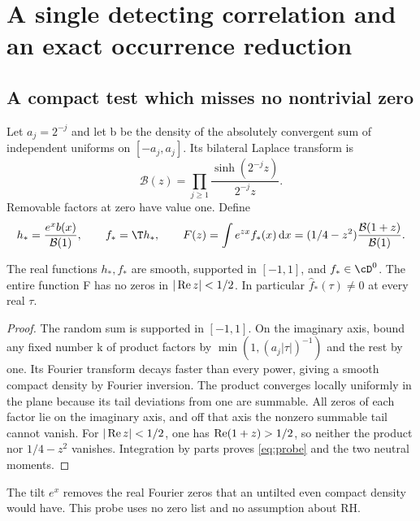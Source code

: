 \section{A single detecting correlation and an exact occurrence reduction}\label{sec:probe}
\subsection{A compact test which misses no nontrivial zero}
Let $a_j=2^{-j}$ and let b be the density of the absolutely
convergent sum of independent uniforms on $[-a_j,a_j]$.
Its bilateral Laplace transform is
\begin{equation}\label{eq:probe-product}
\mathcal B(z)=\prod_{j\ge1}\frac{\sinh(2^{-j}z)}{2^{-j}z}.
\end{equation}
Removable factors at zero have value one. Define
\begin{equation}\label{eq:probe}
h_*=\frac{e^x b(x)}{\mathcal B(1)},\qquad f_*=\T h_*,
\qquad
F(z)=\int e^{zx}f_*(x)\dd x
=(1/4-z^2)\frac{\mathcal B(1+z)}{\mathcal B(1)} .
\end{equation}

\begin{lemma}\label{lem:probe}
The real functions $h_*,f_*$ are smooth, supported in
$[-1,1]$, and $f_*\in\cD^0$. The entire function F has
no zeros in $|\operatorname{Re} z|<1/2$. In particular
$\widehat f_*(\tau)\ne0$ at every real $\tau$.
\end{lemma}
\begin{proof}
The random sum is supported in $[-1,1]$. On the imaginary
axis, bound any fixed number k of product factors by
$\min(1,(a_j|\tau|)^{-1})$ and the rest by one.
Its Fourier transform decays faster than every power,
giving a smooth compact density by Fourier inversion.
The product converges locally uniformly in the plane
because its tail deviations from one are summable.
All zeros of each factor lie on the imaginary axis, and
off that axis the nonzero summable tail cannot vanish.
For $|\operatorname{Re} z|<1/2$, one has $\operatorname{Re}(1+z)>1/2$, so neither
the product nor $1/4-z^2$ vanishes. Integration by parts
proves \eqref{eq:probe} and the two neutral moments.
\end{proof}
The tilt $e^x$ removes the real Fourier zeros that an
untilted even compact density would have. This probe
uses no zero list and no assumption about RH.

